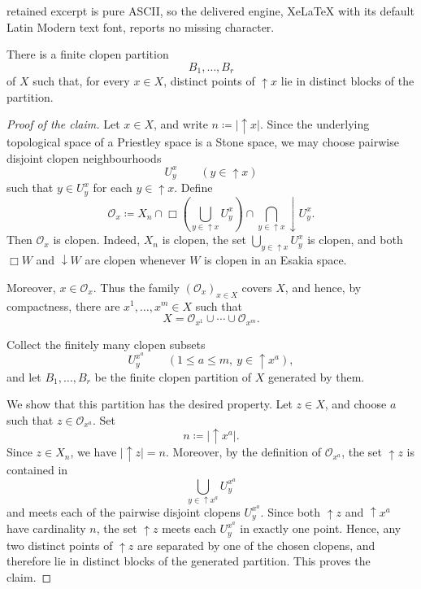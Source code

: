 \documentclass[10pt,a4paper]{amsart}
\renewcommand{\d}{{\downarrow}}
\renewcommand{\u}{{\uparrow}}
\begin{document}
retained excerpt is pure ASCII, so the delivered engine, XeLaTeX with its default Latin Modern text font, reports no missing character.
    \begin{claim} \label{claim:finite-clopen-partition-separating-principal-upsets}
        There is a finite clopen partition
        \[
            B_1,\dots,B_r
        \]
        of $X$ such that, for every $x\in X$, distinct points of ${\u}x$ lie in distinct
        blocks of the partition.
    \end{claim}

    \begin{proof}[Proof of the claim]
        Let $x\in X$, and write $n\coloneqq \lvert{\u}x\rvert$. Since the underlying topological space of a Priestley space is a Stone space, we may choose pairwise
        disjoint clopen neighbourhoods
        \[
            U^x_y\qquad(y\in{\u}x)
        \]
        such that $y\in U^x_y$ for each $y\in{\u}x$. Define
        \[
            \mathcal{O}_x
            \coloneqq
            X_n
            \cap
            \Box\left(\bigcup_{y\in{\u}x}U^x_y\right)
            \cap
            \bigcap_{y\in{\u}x}{\d}U^x_y.
        \]
        Then $\mathcal{O}_x$ is clopen. Indeed, $X_n$ is clopen, the set
        $\bigcup_{y\in{\u}x}U^x_y$ is clopen, and both $\Box W$ and ${\d}W$ are clopen
        whenever $W$ is clopen in an Esakia space.

        Moreover, $x\in\mathcal{O}_x$. Thus the family $(\mathcal{O}_x)_{x\in X}$
        covers $X$, and hence, by compactness, there are $x^1,\dots,x^m\in X$ such that
        \[
            X=\mathcal{O}_{x^1}\cup\cdots\cup\mathcal{O}_{x^m}.
        \]

        Collect the finitely many clopen subsets
        \[
            U^{x^a}_y
            \qquad
            (1\leq a\leq m,\ y\in{\u}x^a),
        \]
        and let $B_1,\dots,B_r$ be the finite clopen partition of $X$ generated by them.

        We show that this partition has the desired property. Let $z\in X$, and choose
        $a$ such that $z\in\mathcal{O}_{x^a}$. Set
        \[
            n\coloneqq \lvert{\u}x^a\rvert.
        \]
        Since $z\in X_n$, we have $\lvert{\u}z\rvert=n$. Moreover, by the definition of
        $\mathcal{O}_{x^a}$, the set ${\u}z$ is contained in
        \[
            \bigcup_{y\in{\u}x^a}U^{x^a}_y
        \]
        and meets each of the pairwise disjoint clopens $U^{x^a}_y$. Since both ${\u}z$
        and ${\u}x^a$ have cardinality $n$, the set ${\u}z$ meets each $U^{x^a}_y$ in
        exactly one point. Hence, any two distinct points of ${\u}z$ are separated by one of
        the chosen clopens, and therefore lie in distinct blocks of the generated partition.
        This proves the claim.
    \end{proof}
\end{document}
